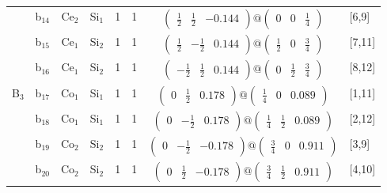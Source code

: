 \documentclass[fleqn,10pt,landscape]{article}
\begin{document}
\begin{itemize}
\begin{center}
\begin{longtable}{cc|cc|c|c|c|l}
& b$_{14}$ & Ce$_{2}$ & Si$_{1}$ & 1 & 1 & $\begin{pmatrix} \frac{1}{2} & \frac{1}{2} & -0.144 \end{pmatrix}@\begin{pmatrix} 0 & 0 & \frac{1}{4} \end{pmatrix}$ & [6,9] \\
& b$_{15}$ & Ce$_{1}$ & Si$_{2}$ & 1 & 1 & $\begin{pmatrix} \frac{1}{2} & - \frac{1}{2} & 0.144 \end{pmatrix}@\begin{pmatrix} \frac{1}{2} & 0 & \frac{3}{4} \end{pmatrix}$ & [7,11] \\
& b$_{16}$ & Ce$_{1}$ & Si$_{2}$ & 1 & 1 & $\begin{pmatrix} - \frac{1}{2} & \frac{1}{2} & 0.144 \end{pmatrix}@\begin{pmatrix} 0 & \frac{1}{2} & \frac{3}{4} \end{pmatrix}$ & [8,12] \\ \hline
B$_{3}$ & b$_{17}$ & Co$_{1}$ & Si$_{1}$ & 1 & 1 & $\begin{pmatrix} 0 & \frac{1}{2} & 0.178 \end{pmatrix}@\begin{pmatrix} \frac{1}{4} & 0 & 0.089 \end{pmatrix}$ & [1,11] \\
& b$_{18}$ & Co$_{1}$ & Si$_{1}$ & 1 & 1 & $\begin{pmatrix} 0 & - \frac{1}{2} & 0.178 \end{pmatrix}@\begin{pmatrix} \frac{1}{4} & \frac{1}{2} & 0.089 \end{pmatrix}$ & [2,12] \\
& b$_{19}$ & Co$_{2}$ & Si$_{2}$ & 1 & 1 & $\begin{pmatrix} 0 & - \frac{1}{2} & -0.178 \end{pmatrix}@\begin{pmatrix} \frac{3}{4} & 0 & 0.911 \end{pmatrix}$ & [3,9] \\
& b$_{20}$ & Co$_{2}$ & Si$_{2}$ & 1 & 1 & $\begin{pmatrix} 0 & \frac{1}{2} & -0.178 \end{pmatrix}@\begin{pmatrix} \frac{3}{4} & \frac{1}{2} & 0.911 \end{pmatrix}$ & [4,10] \\

\end{longtable}
\end{center}
\end{itemize}
\end{document}
